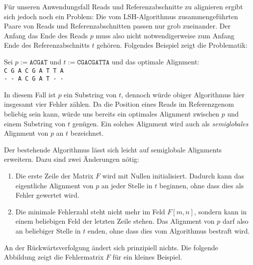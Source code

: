 Für unseren Anwendungsfall Reads und Referenzabschnitte zu alignieren ergibt sich jedoch noch ein Problem: Die vom LSH-Algorithmus zusammengeführten Paare von Reads und Referenzabschnitten passen nur grob zueinander. Der Anfang \bzw das Ende des Reads $p$ muss also nicht notwendigerweise zum Anfang \bzw Ende des Referenzabschnitts $t$ gehören. Folgendes Beispiel zeigt die Problematik:

\begin{beispiel}
\label{bsp:align:basics:optalign}
Sei $p := \texttt{ACGAT}$ und $t := \texttt{CGACGATTA}$ und das optimale Alignment: \\
\texttt{C G A C G A T T A}\\
\texttt{- - A C G A T - -}
\end{beispiel}

In diesem Fall ist $p$ ein Substring von $t$, dennoch würde obiger Algorithmus hier insgesamt vier Fehler zählen. Da die Position eines Reads im Referenzgenom beliebig sein kann, würde uns bereits ein optimales Alignment zwischen $p$ und einem Substring von $t$ genügen. Ein solches Alignment wird auch als \textit{semiglobales} Alignment von $p$ an $t$ bezeichnet.

Der bestehende Algorithmus lässt sich leicht auf semiglobale Alignments erweitern. Dazu sind zwei Änderungen nötig:

\begin{enumerate}
\item Die erste Zeile der Matrix $F$ wird mit Nullen initialisiert. Dadurch kann das eigentliche Alignment von $p$ an jeder Stelle in $t$ beginnen, ohne dass dies als Fehler gewertet wird.
\item Die minimale Fehlerzahl steht nicht mehr im Feld $F[m,n]$, sondern kann in einem beliebigen Feld der letzten Zeile stehen. Das Alignment von $p$ darf also an beliebiger Stelle in $t$ enden, ohne dass dies vom Algorithmus bestraft wird.
\end{enumerate}

An der Rückwärtsverfolgung ändert sich prinzipiell nichts. Die folgende Abbildung zeigt die Fehlermatrix $F$ für ein kleines Beispiel.

